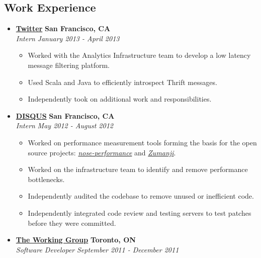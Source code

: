 \documentclass[10pt,letterpaper]{article}
\begin{document}
\subsection*{Work Experience}
  \begin{itemize}
    \parskip=-0.1em

    \item[]
    {\href{http://www.twitter.com}{\textbf{Twitter}} \hfill
      \textbf{San Francisco, CA}}
    \\
    {\emph{Intern} \hfill \emph{January 2013 - April 2013}}

    \begin{itemize}[label=\textbullet]
      \itemsep0em
      \item Worked with the Analytics Infrastructure team to develop a low
      latency message filtering platform.
      \item Used Scala and Java to efficiently introspect Thrift messages.
      \item Independently took on additional work and responsibilities.
    \end{itemize}

    \item[]
    {\href{http://www.disqus.com}{\textbf{DISQUS}} \hfill
      \textbf{San Francisco, CA}}
    \\
    {\emph{Intern} \hfill \emph{May 2012 - August 2012}}

    \begin{itemize}[label=\textbullet]
      \itemsep0em
      \item Worked on performance measurement tools forming the basis for the
            open source projects:
            \href{https://github.com/disqus/nose-performance}{\textit{nose-performance}}
            and \href{https://github.com/disqus/zumanji}{\textit{Zumanji}}.
      \item Worked on the infrastructure team to identify and remove performance
            bottlenecks.
      \item Independently audited the codebase to remove unused or inefficient
            code.
      \item Independently integrated code review and testing servers to test
            patches before they were committed.
    \end{itemize}


    \item[]
    {\href{http://www.twg.ca}{\textbf{The Working Group}} \hfill
      \textbf{Toronto, ON}}
    \\
    {\emph{Software Developer} \hfill \emph{September 2011 - December 2011}}


\end{itemize}
\end{document}
